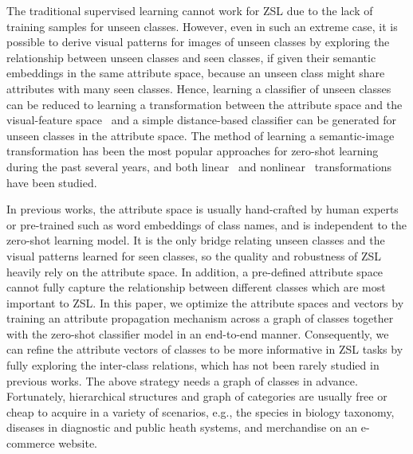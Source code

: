 \documentclass[letterpaper]{article}
\begin{document}
The traditional supervised learning cannot work for ZSL due to the lack of training samples for unseen classes. However, even in such an extreme case, it is possible to derive visual patterns for images of unseen classes by exploring the relationship between unseen classes and seen classes, if given their semantic embeddings in the same attribute space, because an unseen class might share attributes with many seen classes.
Hence, learning a classifier of unseen classes can be reduced to learning a transformation between the attribute space and the visual-feature space~\cite{frome2013devise,xie2019attentive} and a simple distance-based classifier can be generated for unseen classes in the attribute space.
The method of learning a semantic-image transformation has been the most popular approaches for zero-shot learning during the past several years, and both  linear~\cite{frome2013devise} and nonlinear~\cite{socher2013zero,xian2016latent} transformations have been studied.




In previous works, the attribute space is usually hand-crafted by human experts or pre-trained such as word embeddings of class names, and is independent to the zero-shot learning model. It is the only bridge relating unseen classes and the visual patterns learned for seen classes, so the quality and robustness of ZSL heavily rely on the attribute space. In addition, a pre-defined attribute space cannot fully capture the relationship between different classes which are most important to ZSL.
In this paper, we optimize the attribute spaces and vectors by training an attribute propagation mechanism across a graph of classes together with the zero-shot classifier model in an end-to-end manner. Consequently, we can refine the attribute vectors of classes to be more informative in ZSL tasks by fully exploring the inter-class relations, which has not been rarely studied in previous works.
The above strategy needs a graph of classes in advance. Fortunately, hierarchical structures and graph of categories are usually free or cheap to acquire in a variety of scenarios, e.g., the species in biology taxonomy, diseases in diagnostic and public heath systems, and merchandise on an e-commerce website.
\end{document}
